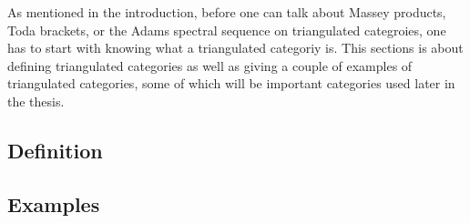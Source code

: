 As mentioned in the introduction, before one can talk about Massey products, Toda brackets, or the Adams spectral sequence on triangulated categroies, one has to start with knowing what a triangulated categoriy is. This sections is about defining triangulated categories as well as giving a couple of examples of triangulated categories, some of which will be important categories used later in the thesis.

\subsection{Definition}


\subsection{Examples}
